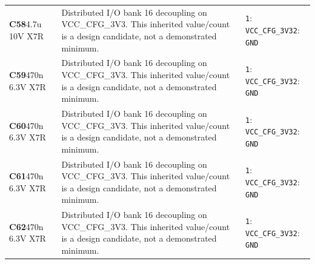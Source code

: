 \documentclass[11pt,a4paper]{article}
\begin{document}
\begin{longtable}{@{}P{27mm}P{84mm}P{57mm}@{}}
\textbf{C58}\newline 4.7u 10V X7R & Distributed I/O bank 16 decoupling on VCC\_CFG\_3V3. This inherited value/count is a design candidate, not a demonstrated minimum. & \nolinkurl{1}: \nolinkurl{VCC_CFG_3V3}\newline \nolinkurl{2}: \nolinkurl{GND} \\
\textbf{C59}\newline 470n 6.3V X7R & Distributed I/O bank 16 decoupling on VCC\_CFG\_3V3. This inherited value/count is a design candidate, not a demonstrated minimum. & \nolinkurl{1}: \nolinkurl{VCC_CFG_3V3}\newline \nolinkurl{2}: \nolinkurl{GND} \\
\textbf{C60}\newline 470n 6.3V X7R & Distributed I/O bank 16 decoupling on VCC\_CFG\_3V3. This inherited value/count is a design candidate, not a demonstrated minimum. & \nolinkurl{1}: \nolinkurl{VCC_CFG_3V3}\newline \nolinkurl{2}: \nolinkurl{GND} \\
\textbf{C61}\newline 470n 6.3V X7R & Distributed I/O bank 16 decoupling on VCC\_CFG\_3V3. This inherited value/count is a design candidate, not a demonstrated minimum. & \nolinkurl{1}: \nolinkurl{VCC_CFG_3V3}\newline \nolinkurl{2}: \nolinkurl{GND} \\
\textbf{C62}\newline 470n 6.3V X7R & Distributed I/O bank 16 decoupling on VCC\_CFG\_3V3. This inherited value/count is a design candidate, not a demonstrated minimum. & \nolinkurl{1}: \nolinkurl{VCC_CFG_3V3}\newline \nolinkurl{2}: \nolinkurl{GND} \\

\end{longtable}
\end{document}

